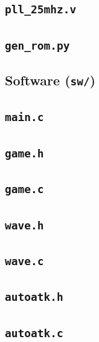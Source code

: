 \documentclass[11pt,letterpaper]{article}
\begin{document}
\subsection*{\texttt{pll\_25mhz.v}}


\subsection*{\texttt{gen\_rom.py}}


\subsection*{Software (\texttt{sw/})}

\subsection*{\texttt{main.c}}


\subsection*{\texttt{game.h}}


\subsection*{\texttt{game.c}}


\subsection*{\texttt{wave.h}}


\subsection*{\texttt{wave.c}}


\subsection*{\texttt{autoatk.h}}


\subsection*{\texttt{autoatk.c}}

\end{document}
